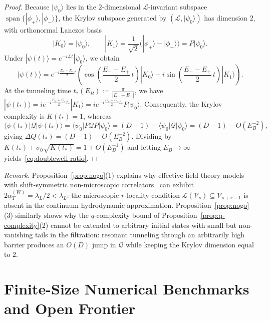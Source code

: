\documentclass[11pt,a4paper]{article}
\numberwithin{equation}{section}
\theoremstyle{plain}
\theoremstyle{definition}
\begin{document}
\begin{proof}
Because $|\psi_0\rangle$ lies in the $2$-dimensional $\mathcal{L}$-invariant subspace $\operatorname{span}\{|\phi_+\rangle,|\phi_-\rangle\}$, the Krylov subspace generated by $(\mathcal{L},|\psi_0\rangle)$ has dimension $2$, with orthonormal Lanczos basis
\[
  |K_0\rangle = |\psi_0\rangle, \qquad
  |K_1\rangle = \frac{1}{\sqrt{2}}\bigl(|\phi_+\rangle - |\phi_-\rangle\bigr) = P|\psi_0\rangle.
\]
Under $|\psi(t)\rangle = e^{-i\mathcal{L}t}|\psi_0\rangle$, we obtain
\[
  |\psi(t)\rangle
  = e^{-i\frac{E_++E_-}{2}t}\left(\cos\!\left(\frac{E_--E_+}{2}\,t\right)|K_0\rangle
    + i\sin\!\left(\frac{E_--E_+}{2}\,t\right)|K_1\rangle\right).
\]
At the tunneling time $t_*(E_B) := \frac{\pi}{|E_--E_+|}$, we have $|\psi(t_*)\rangle = i e^{-i\frac{E_++E_-}{2}t_*}|K_1\rangle = i e^{-i\frac{E_++E_-}{2}t_*}P|\psi_0\rangle$. Consequently, the Krylov complexity is $K(t_*) = 1$, whereas
\[
  \langle\psi(t_*)|\mathcal{Q}|\psi(t_*)\rangle
  = \langle\psi_0|P\mathcal{Q}P|\psi_0\rangle
  = (D-1) - \langle\psi_0|\mathcal{Q}|\psi_0\rangle
  = (D-1) - O(E_B^{-2}),
\]
giving $\Delta Q(t_*) = (D-1) - O(E_B^{-2})$. Dividing by $K(t_*) + \sigma_0\sqrt{K(t_*)} = 1 + O(E_B^{-1})$ and letting $E_B\to\infty$ yields~\eqref{eq:doublewell-ratio}.
\end{proof}

\noindent\emph{Remark.}
Proposition~\ref{prop:nogo}(1) explains why effective field theory models with shift-symmetric non-microscopic correlators~\cite{Demulder2026} can exhibit $2\alpha_T^{(W)} = \lambda_L/2 < \lambda_L$: the microscopic $r$-locality condition $\mathcal{L}(\mathcal{V}_s)\subseteq\mathcal{V}_{s+r-1}$ is absent in the continuum hydrodynamic approximation. Proposition~\ref{prop:nogo}(3) similarly shows why the $q$-complexity bound of Proposition~\ref{prop:q-complexity}(2) cannot be extended to arbitrary initial states with small but non-vanishing tails in the filtration: resonant tunneling through an arbitrarily high barrier produces an $O(D)$ jump in $\mathcal{Q}$ while keeping the Krylov dimension equal to $2$.

\section{Finite-Size Numerical Benchmarks and Open Frontier}\label{sec:numerics}
\end{document}
